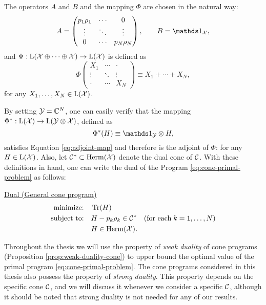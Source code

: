 The operators $A$ and $B$ and the mapping $\Phi$ are chosen in the natural way:
\begin{equation}
  A = \begin{pmatrix}
    p_1 \rho_1 & \cdots & 0 \\
    \vdots & \ddots & \vdots\\
    0 & \cdots & p_N\rho_N
  \end{pmatrix},
  \qquad
  B = \I_{\X},
\end{equation}
and $\Phi : \mathrm{L}(\mathcal{X}\oplus\cdots\oplus\mathcal{X}) \rightarrow \mathrm{L}(\mathcal{X})$ is defined as 
\begin{equation}
  \Phi\begin{pmatrix}
  X_{1} & \cdots & \cdot \\
  \vdots & \ddots & \vdots\\
  \cdot & \cdots & X_{N}
  \end{pmatrix}
  \equiv X_{1}+\cdots+X_{N},
\end{equation}
for any $X_{1}, \ldots, X_{N} \in \mathrm{L}(\mathcal{X})$.

By setting $\mathcal{Y} = \mathbb{C}^{N}$, one can easily verify that the mapping 
$\Phi^{\ast}: \mathrm{L}(\mathcal{X})\rightarrow\mathrm{L}(\mathcal{Y}\otimes\mathcal{X})$,
defined as  
\begin{equation}
  \Phi^{\ast}(H) \equiv \I_{\Y}\otimes H,
\end{equation}
satisfies Equation \eqref{eq:adjoint-map} and therefore is 
the adjoint of $\Phi$:
for any $H\in\mathrm{L}(\mathcal{X})$. 
Also, let $\mathcal{C}^{\ast} \subset \mathrm{Herm}(\mathcal{X})$ denote the dual cone of $\mathcal{C}$.
With these definitions in hand, one can write the dual of the Program 
\eqref{eq:cone-primal-problem} as follows:
\begin{center}
\underline{Dual (General cone program)}
\begin{equation}
  \label{eq:cone-dual-problem}
  \begin{split}
    \text{minimize:} \quad & \operatorname{Tr}(H)\\
    \text{subject to:} \quad & H-p_k\rho_k\in\mathcal{C}^{\ast}
    \quad(\text{for each}\;k = 1,\ldots,N)\\
    \quad & H \in \mathrm{Herm}(\mathcal{X}).
  \end{split}
\end{equation}
\end{center}

Throughout the thesis we will use the property of \emph{weak duality} of cone 
programs (Proposition \ref{prop:weak-duality-cone}) to upper bound the
optimal value of the primal program \eqref{eq:cone-primal-problem}.
The cone programs considered in this thesis also possess the property 
of \emph{strong duality}. This property depends on the specific cone $\mathcal{C}$,
and we will discuss it whenever we consider a specific $\mathcal{C}$, although
it should be noted that strong duality is not needed for any of our results.

